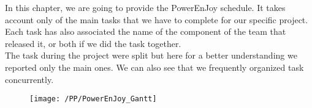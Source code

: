 In this chapter, we are going to provide the PowerEnJoy schedule. It takes account only of the main tasks that we have to complete for our specific project. Each task has also associated the name of the component of the team that released it, or both if we did the task together. 
\\The task during the project were split but here for a better understanding we reported only the main ones. We can also see that we frequently organized task concurrently.

\begin{center}
\begin{figure}[!ht]
  \centering
  \vspace{0.2cm}
  \texttt{[image: /PP/PowerEnJoy\_Gantt]}\\
  \vspace{0.2cm}
  \label{fig:gantt} 
\end{figure}
\end{center}


